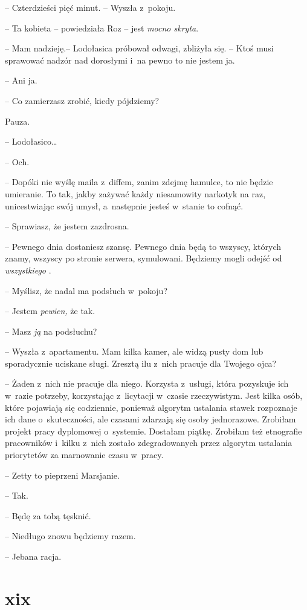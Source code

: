 \documentclass[oneside,polish,11pt,sfheadings]{mwbk}
\begin{document}
-- Czterdzieści pięć minut. -- Wyszła z~pokoju.

-- Ta kobieta -- powiedziała Roz -- jest \textit{mocno skryta}.

-- Mam nadzieję.-- Lodołasica próbował odwagi, zbliżyła się. -- Ktoś musi
sprawować nadzór nad dorosłymi i~na pewno to nie jestem ja.

-- Ani ja.

-- Co zamierzasz zrobić, kiedy pójdziemy?

Pauza. 

-- Lodołasico\ldots 

-- Och.

-- Dopóki nie wyślę maila z~diffem, zanim zdejmę hamulce, to nie będzie
umieranie. To tak, jakby zażywać każdy niesamowity narkotyk na raz,
unicestwiając swój umysł, a~następnie jesteś w~stanie to cofnąć.

-- Sprawiasz, że jestem zazdrosna.

-- Pewnego dnia dostaniesz szansę. Pewnego dnia będą to wszyscy, których
znamy, wszyscy po stronie serwera, symulowani. Będziemy mogli odejść od
\textit{wszystkiego }.

-- Myślisz, że nadal ma podsłuch w~pokoju?

-- Jestem \textit{pewien, }że tak.

-- Masz \textit{ją }na podsłuchu?

-- Wyszła z~apartamentu. Mam kilka kamer, ale widzą pusty dom lub
sporadycznie uciskane sługi. Zresztą ilu z~nich pracuje dla Twojego
ojca?

-- Żaden z~nich nie pracuje dla niego. Korzysta z~usługi, która pozyskuje
ich w~razie potrzeby, korzystając z~licytacji w~czasie rzeczywistym.
Jest kilka osób, które pojawiają się codziennie, ponieważ algorytm
ustalania stawek rozpoznaje ich dane o~skuteczności, ale czasami
zdarzają się osoby jednorazowe. Zrobiłam projekt pracy dyplomowej o~systemie. Dostałam piątkę. Zrobiłam też etnografie pracowników i~kilku z~nich zostało zdegradowanych przez algorytm ustalania priorytetów za
marnowanie czasu w~pracy.

-- Zetty to pieprzeni Marsjanie.

-- Tak.

-- Będę za tobą tęsknić.

-- Niedługo znowu będziemy razem.

-- Jebana racja.

\chapter*{xix}
 
\end{document}
